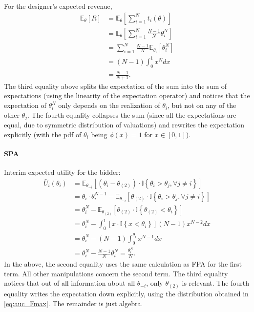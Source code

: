 \documentclass[a4paper]{article}
\begin{document}
For the designer's expected revenue,
\begin{align*}
	\mathbb{E}_\theta [R]
	&= \mathbb{E}_\theta \left[ \sum_{i=1}^N t_i(\theta) \right]
	\\
	&= \mathbb{E}_\theta \left[ \sum_{i=1}^N \frac{N-1}{N} \theta_i^N \right]
	\\
	&= \sum_{i=1}^N \frac{N-1}{N} \mathbb{E}_{\theta_i} \left[ \theta_i^N \right]
	\\
	&= (N-1) \int_0^1 x^N dx
	\\
	&= \frac{N-1}{N+1}.
\end{align*}
The third equality above splits the expectation of the sum into the sum of expectations (using the linearity of the expectation operator) and notices that the expectation of $\theta_i^N$ only depends on the realization of $\theta_i$, but not on any of the other $\theta_j$. The fourth equality collapses the sum (since all the expectations are equal, due to symmetric distribution of valuations) and rewrites the expectation explicitly (with the pdf of $\theta_i$ being $\phi(x)=1$ for $x \in [0,1]$).


\paragraph*{SPA}
Interim expected utility for the bidder:
\begin{align*}
	\bar{U}_i(\theta_i) &= \mathbb{E}_{\theta_{-i}} \left[ \left( \theta_i - \theta_{(2)} \right) \cdot \mathbb{I} \left\{ \theta_i > \theta_j, \forall j \neq i \right\} \right]
	\\
	&= \theta_i \cdot \theta_i^{N-1} - \mathbb{E}_{\theta_{-i}} \left[ \theta_{(2)} \cdot \mathbb{I} \left\{ \theta_i > \theta_j, \forall j \neq i \right\} \right]
	\\
	&= \theta_i^N - \mathbb{E}_{\theta_{(2)}} \left[ \theta_{(2)} \cdot \mathbb{I} \left\{ \theta_{(2)} < \theta_i \right\} \right]
	\\
	&= \theta_i^N - \int_0^1 \left[ x \cdot \mathbb{I} \left\{ x < \theta_i \right\} \right] (N-1)x^{N-2} dx
	\\
	&=\theta_i^N - (N-1) \int_0^{\theta_i} x^{N-1} dx
	\\
	&=\theta_i^N - \frac{N-1}{N} \theta_i^N = \frac{\theta_i^N}{N}.
\end{align*}
In the above, the second equality uses the same calculation as FPA for the first term. All other manipulations concern the second term. The third equality notices that out of all information about all $\theta_{-i}$, only $\theta_{(2)}$ is relevant. The fourth equality writes the expectation down explicitly, using the distribution obtained in \eqref{eq:auc_Fmax}. The remainder is just algebra.
\end{document}
